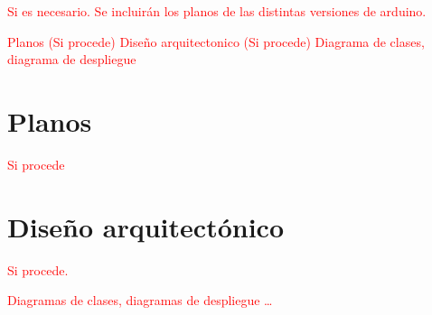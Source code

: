 
\textcolor{red}{Si es necesario.
Se incluirán los planos de las distintas versiones de arduino.}

\textcolor{red}{
    Planos (Si procede)
    Diseño arquitectonico (Si procede)
        Diagrama de clases, diagrama de despliegue}

\section{Planos}

\textcolor{red}{Si procede}

\section{Diseño arquitectónico}

\textcolor{red}{Si procede.}

\textcolor{red}{Diagramas de clases, diagramas de despliegue \ldots}

